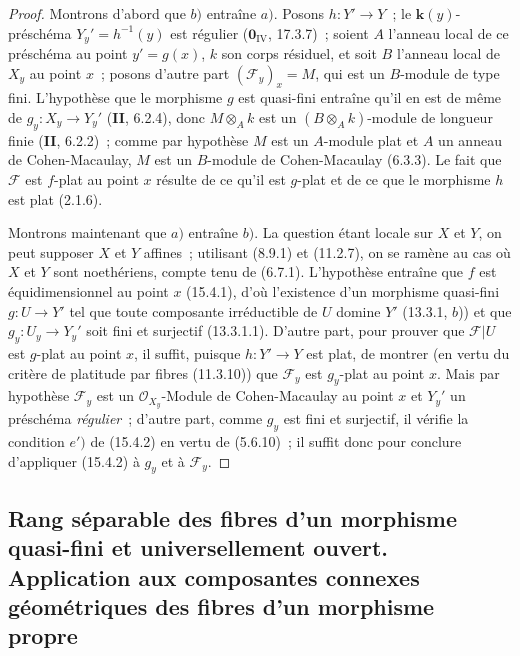 \begin{proof}
Montrons d'abord que $b)$ entraîne $a)$. Posons $h:Y'\to Y$~; le
$\mathbf{k}(y)$-préschéma $Y_y'=h^{-1}(y)$ est régulier
($\mathbf{0}_{\mathrm{IV}}$, 17.3.7)~; soient $A$ l'anneau local de ce préschéma
au point $y'=g(x)$, $k$ son corps résiduel, et soit $B$ l'anneau local de $X_y$
au point $x$~; posons d'autre part $(\mathcal F_y)_x=M$, qui est un $B$-module
de type fini. L'hypothèse que le morphisme $g$ est quasi-fini entraîne qu'il en
est de même de $g_y:X_y\to Y_y'$ (\textbf{II}, 6.2.4), donc $M\otimes_A k$ est
un $(B\otimes_A k)$-module de longueur finie (\textbf{II}, 6.2.2)~; comme par
hypothèse $M$ est un $A$-module plat et $A$ un anneau de Cohen-Macaulay, $M$ est
un $B$-module de Cohen-Macaulay (6.3.3). Le fait que $\mathcal F$ est $f$-plat
au point $x$ résulte de ce qu'il est $g$-plat et de ce que le morphisme $h$ est
plat (2.1.6).

Montrons maintenant que $a)$ entraîne $b)$. La question étant locale sur $X$ et
$Y$, on peut supposer $X$ et $Y$ affines~; utilisant (8.9.1) et (11.2.7), on se
ramène au cas où $X$ et $Y$ sont noethériens, compte tenu de (6.7.1).
L'hypothèse entraîne que $f$ est
équidimensionnel au point $x$ (15.4.1), d'où l'existence d'un morphisme
quasi-fini $g:U\to Y'$ tel que toute composante irréductible de $U$ domine $Y'$
(13.3.1, $b$)) et que $g_y:U_y\to Y_y'$ soit fini et surjectif (13.3.1.1).
D'autre part, pour prouver que $\mathcal F|U$ est $g$-plat au point $x$, il
suffit, puisque $h:Y'\to Y$ est plat, de montrer (en vertu du critère de
platitude par fibres (11.3.10)) que $\mathcal F_y$ est $g_y$-plat au point $x$.
Mais par hypothèse $\mathcal F_y$ est un $\mathcal O_{X_y}$-Module de
Cohen-Macaulay au point $x$ et $Y_y'$ un préschéma \emph{régulier}~; d'autre
part, comme $g_y$ est fini et surjectif, il vérifie la condition $e')$ de
(15.4.2) en vertu de (5.6.10)~; il suffit donc pour conclure d'appliquer (15.4.2)
à $g_y$ et à $\mathcal F_y$.
\end{proof}


\subsection{Rang séparable des fibres d'un morphisme quasi-fini et universellement ouvert. Application aux composantes connexes géométriques des fibres d'un morphisme propre}
\label{subsection:IV.15.5-fr}

